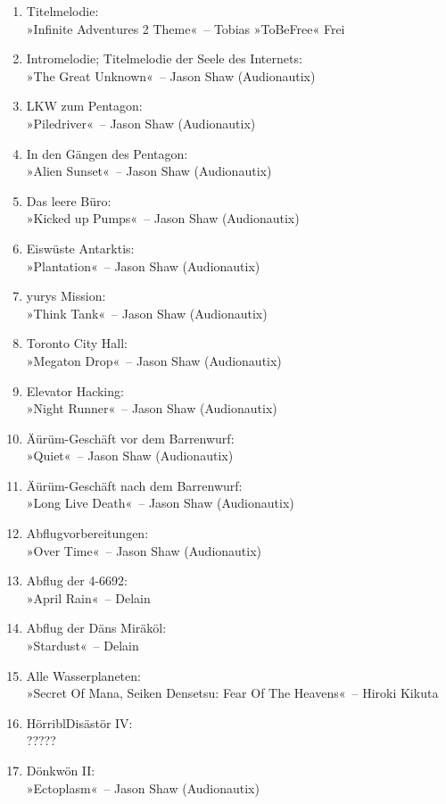 \begin{enumerate}
    \item Titelmelodie:\\ »Infinite Adventures 2 Theme«~– Tobias »ToBeFree« Frei
    \item Intromelodie; Titelmelodie der Seele des Internets:\\ »The Great Unknown«~– Jason Shaw (Audionautix)
    \item LKW zum Pentagon:\\ »Piledriver«~– Jason Shaw (Audionautix)
    \item In den Gängen des Pentagon:\\ »Alien Sunset«~– Jason Shaw (Audionautix)
    \item Das leere Büro:\\ »Kicked up Pumps«~– Jason Shaw (Audionautix)
    \item Eiswüste Antarktis:\\ »Plantation«~– Jason Shaw (Audionautix)
    \item yurys Mission:\\ »Think Tank«~– Jason Shaw (Audionautix)
    \item Toronto City Hall:\\ »Megaton Drop«~– Jason Shaw (Audionautix)
    \item Elevator Hacking:\\ »Night Runner«~– Jason Shaw (Audionautix)
    \item Äürüm-Geschäft vor dem Barrenwurf:\\ »Quiet«~– Jason Shaw (Audionautix)
    \item Äürüm-Geschäft nach dem Barrenwurf:\\ »Long Live Death«~– Jason Shaw (Audionautix)
    \item Abflugvorbereitungen:\\ »Over Time«~– Jason Shaw (Audionautix)
    \item Abflug der 4-6692:\\ »April Rain«~– Delain
    \item Abflug der Däns Miräköl:\\ »Stardust«~– Delain
    \item Alle Wasserplaneten:\\ »Secret Of Mana, Seiken Densetsu: Fear Of The Heavens«~– Hiroki Kikuta
    \item HörriblDisästör IV:\\ ?????
    \item Dönkwön II:\\ »Ectoplasm«~– Jason Shaw (Audionautix)

\end{enumerate}
